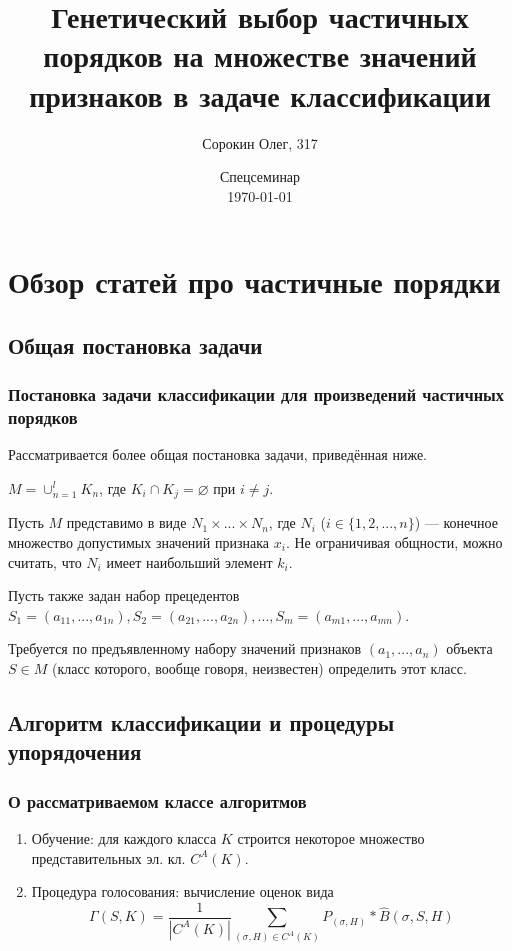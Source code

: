 \documentclass[
	11pt,
]{beamer}
\title[Генетический подход к выбору частичных порядков]{Генетический выбор частичных порядков на множестве значений признаков в задаче классификации}
\author[Сорокин Олег, 317 группа ММП ВМК МГУ]{Сорокин Олег, 317}
\institute[ММП ВМК МГУ]{ММП ВМК МГУ}
\date[\today]{Спецсеминар \\ \today}
\begin{document}
\begin{frame}
	\titlepage
\end{frame}

\begin{frame}
	\tableofcontents
\end{frame}

\section{Обзор статей про частичные порядки}

\subsection{Общая постановка задачи}

\begin{frame}
	\frametitle{Постановка задачи классификации для произведений частичных порядков}
	
    Рассматривается более общая постановка задачи, приведённая ниже.

    \bigskip

	$M = \cup_{n=1}^{l}K_n$, где $K_i \cap K_j = \varnothing$ при $i \neq j$.

	\bigskip

	Пусть $M$ представимо в виде $N_1 \times ... \times N_n$, где $N_i$ ($i \in \{1, 2, ..., n\}$) — конечное множество допустимых значений признака $x_i$. Не ограничивая общности, можно считать, что $N_i$ имеет наибольший элемент $k_i$.

	Пусть также задан набор прецедентов $S_1 = (a_{11}, ..., a_{1n}), S_2 = (a_{21}, ..., a_{2n}), ..., S_m = (a_{m1}, ..., a_{mn})$.

	\bigskip

	Требуется по предъявленному набору значений признаков $(a_1, ..., a_n)$ объекта $S \in M$ (класс которого, вообще говоря, неизвестен) определить этот класс.

\end{frame}

\subsection{Алгоритм классификации и процедуры упорядочения}

\begin{frame}
	\frametitle{О рассматриваемом классе алгоритмов}
	
	\begin{enumerate}
		\item Обучение: для каждого класса $K$ строится некоторое множество представительных эл. кл. $C^A(K)$.
		\item Процедура голосования: вычисление оценок вида
			  $$\Gamma(S, K) = \frac{1}{|C^A(K)|} \sum_{(\sigma, H) \in C^A(K)} P_{(\sigma, H)} * \hat{B}(\sigma, S, H)$$
	\end{enumerate}
\end{frame}
\end{document}
